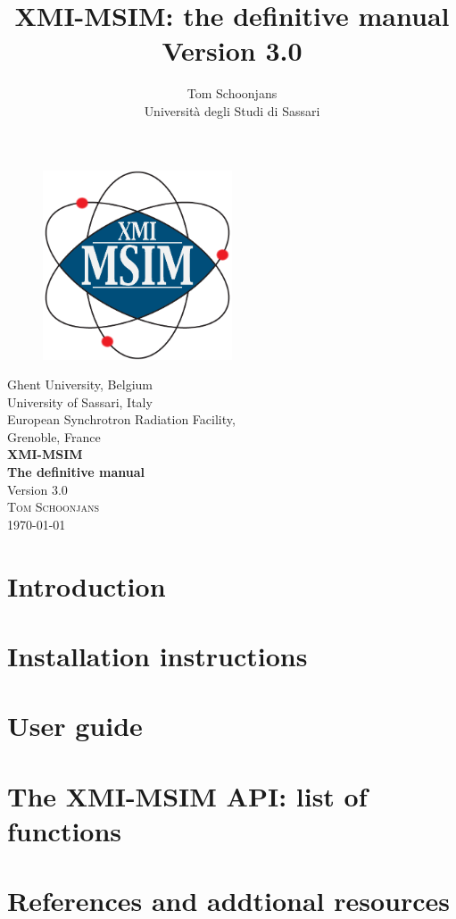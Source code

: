 \documentclass[11pt,a4paper,oneside,titlepage]{article}
\title{XMI-MSIM: the definitive manual\\\small{Version 3.0}}
\author{Tom Schoonjans\\Universit\`a degli Studi di Sassari}
\begin{document}
\begin{titlepage}
\begin{center}
\begin{figure}
\begin{center}
\includegraphics[width=0.5\textwidth]{Logo_xmi_msim.png}
\end{center}
\end{figure}
\vspace{1cm}
\Large{Ghent University, Belgium\\}
\vspace{0.7cm}
\Large{University of Sassari, Italy\\}
\vspace{0.7cm}
\Large{European Synchrotron Radiation Facility,\\Grenoble, France\\}
\vspace{1.5cm}
\Huge{\bfseries{XMI-MSIM\\}}
\vspace{1.5cm}
\huge{\bfseries{The definitive manual\\}}
\vspace{1.5cm}
\Large{Version 3.0\\}
\vspace{1.5cm}
\textsc{\large{Tom Schoonjans\\}}
\vfill
{\large \today}
\end{center}
\end{titlepage}


\tableofcontents
\newpage

\section{Introduction}


\section{Installation instructions}

\section{User guide}

\section{The XMI-MSIM API: list of functions}

\section{References and addtional resources}

\end{document}
